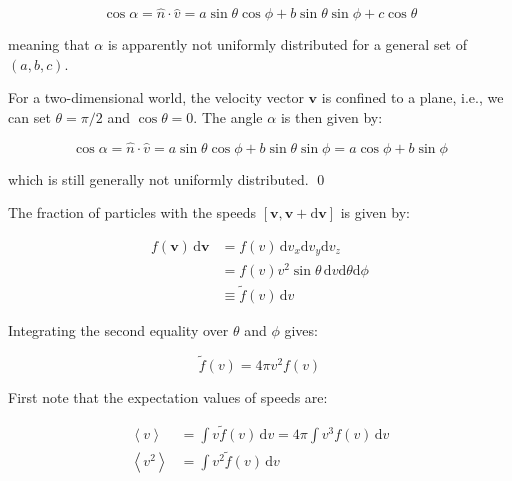 \documentclass[12pt]{article}
\begin{document}
\begin{equation}
    \cos{\alpha} = \hat{n} \cdot \hat{v} = a \sin{\theta} \cos{\phi} + b \sin{\theta} \sin{\phi} + c \cos{\theta}
\end{equation}

meaning that $\alpha$ is apparently not uniformly distributed for a general set of $(a, b, c)$.

For a two-dimensional world, the velocity vector $\mathbf{v}$ is confined to a plane, i.e., we can set $\theta = \pi/2$ and $\cos{\theta} = 0$. The angle $\alpha$ is then given by:

\begin{equation}
    \cos{\alpha} = \hat{n} \cdot \hat{v} = a \sin{\theta} \cos{\phi} + b \sin{\theta} \sin{\phi} = a \cos{\phi} + b \sin{\phi}
\end{equation}

which is still generally not uniformly distributed.
\qed



The fraction of particles with the speeds $[\mathbf{v}, \mathbf{v} + \mathrm{d}\mathbf{v}]$ is given by:

\begin{equation}
\begin{split}
    f(\mathbf{v}) \, \mathrm{d}\mathbf{v} &= f(v) \, \mathrm{d}v_{x} \mathrm{d}v_{y} \mathrm{d}v_{z} \\
    &= f(v) v^{2} \sin{\theta} \, \mathrm{d}v \mathrm{d}\theta \mathrm{d}\phi \\
    &\equiv \tilde{f}(v) \, \mathrm{d}v
\end{split}
\end{equation}

Integrating the second equality over $\theta$ and $\phi$ gives:

\begin{equation}
    \tilde{f}(v) = 4\pi v^{2} f(v)
\end{equation}

First note that the expectation values of speeds are:

\begin{equation}
\begin{split}
    \left\langle v \right\rangle &= \int v \tilde{f}(v) \, \mathrm{d}v = 4\pi \int v^{3} f(v) \, \mathrm{d}v \\
    \left\langle v^{2} \right\rangle &= \int v^{2} \tilde{f}(v) \, \mathrm{d}v
\end{split}
\end{equation}
\end{document}
